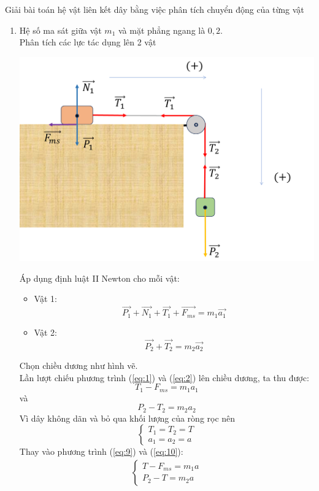 \begin{dang}{Giải bài toán hệ vật liên kết dây bằng việc phân tích chuyển động của từng vật}
{\begin{enumerate}[label=\alph*)]
\item Hệ số ma sát giữa vật $m_1$ và mặt phẳng ngang là $0,2$.\\
Phân tích các lực tác dụng lên 2 vật
\begin{center}
	\includegraphics[width=0.6\linewidth]{../figs/VN10-2023-PH-TP021-3}
\end{center}
Áp dụng định luật II Newton cho mỗi vật:
\begin{itemize}
	\item Vật 1:
	\begin{equation}
		\label{eq:7}
		\overrightarrow{P_1}+\overrightarrow{N_1}+\overrightarrow{T_1}+\overrightarrow{F_{ms}}=m_1\overrightarrow{a_1}
	\end{equation}
	\item Vật 2:
	\begin{equation}
		\label{eq:8}
		\overrightarrow{P_2}+\overrightarrow{T_2}=m_2\overrightarrow{a_2}
	\end{equation}
\end{itemize}
Chọn chiều dương như hình vẽ.\\
Lần lượt chiếu phương trình (\ref{eq:1}) và (\ref{eq:2}) lên chiều dương, ta thu được:
\begin{equation}
	\label{eq:9}
	T_1-F_{ms}=m_1a_1
\end{equation}
và
\begin{equation}
	\label{eq:10}
	P_2-T_2=m_2a_2
\end{equation}
Vì dây không dãn và bỏ qua khối lượng của ròng rọc nên
$$\begin{cases}
	T_1=T_2=T\\
	a_1=a_2=a
\end{cases}$$
Thay vào phương trình (\ref{eq:9}) và (\ref{eq:10}):
\begin{align}
	\label{eq:11}
	\begin{cases}
		T-F_{ms}=m_1a\\
		P_2-T=m_2a
	\end{cases}
\end{align}

\end{enumerate}}
\end{dang}
